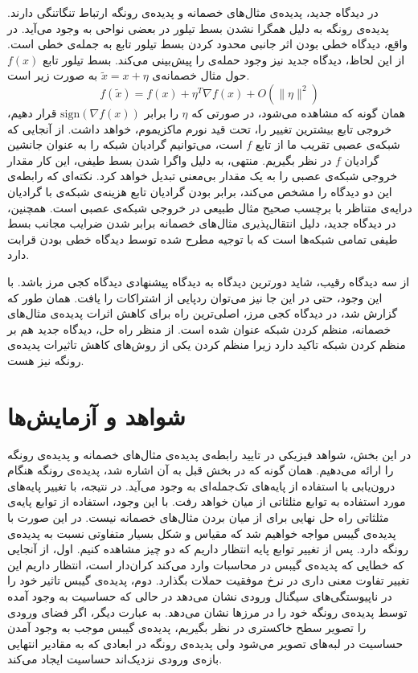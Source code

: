 \documentclass[12pt,onecolumn,a4paper]{article}
\begin{document}
در دیدگاه جدید، پدیده‌ی مثال‌های خصمانه و پدیده‌ی رونگه ارتباط تنگاتنگی دارند. پدیده‌ی رونگه به دلیل همگرا نشدن بسط  تیلور در بعضی نواحی به وجود می‌آید. در واقع، دیدگاه خطی بودن اثر جانبی محدود کردن بسط تیلور تابع به جمله‌ی خطی است. از این لحاظ، دیدگاه جدید نیز وجود حمله‌ی
را پیش‌بینی می‌کند. بسط تیلور تابع $f(x)$ حول مثال خصمانه‌ی $\tilde{x}=x+\eta$ به صورت زیر است.
\begin{equation*}
f(\tilde{x})=f(x)+\eta^T\nabla f(x) + O(\|\eta\|^2)
\end{equation*}
همان گونه که مشاهده می‌شود، در صورتی که $\eta$ را برابر $\mathrm{sign}(\nabla f(x))$ قرار دهیم، خروجی تابع بیشترین تغییر را، تحت قید نورم ماکزیموم، خواهد داشت. از آنجایی که شبکه‌ی عصبی تقریب ما از تابع $f$ است، می‌توانیم گرادیان شبکه را به عنوان جانشین گرادیان $f$ در نظر بگیریم. منتهی، به دلیل واگرا شدن بسط طیفی، این کار مقدار خروجی شبکه‌ی عصبی را به یک مقدار بی‌معنی تبدیل خواهد کرد. نکته‌ای که رابطه‌ی این دو دیدگاه را مشخص می‌کند، برابر بودن گرادیان تابع هزینه‌ی شبکه‌ی  با گرادیان درایه‌ی متناظر با برچسب صحیح مثال طبیعی در خروجی شبکه‌ی عصبی است. همچنین، در دیدگاه جدید، دلیل انتقال‌پذیری مثال‌های خصمانه برابر شدن ضرایب مجانب بسط طیفی تمامی شبکه‌ها است که با توجیه مطرح شده توسط دیدگاه خطی بودن قرابت دارد.

از سه دیدگاه رقیب، شاید دورترین دیدگاه به دیدگاه پیشنهادی دیدگاه کجی مرز باشد. با این وجود، حتی در این جا نیز می‌توان ردپایی از اشتراکات را یافت. همان طور که گزارش شد، در دیدگاه کجی مرز، اصلی‌ترین راه برای کاهش اثرات پدیده‌ی مثال‌های خصمانه، منظم کردن شبکه عنوان شده است. از منظر راه حل، دیدگاه جدید هم بر منظم کردن شبکه تاکید دارد زیرا منظم کردن یکی از روش‌های کاهش تاثیرات پدیده‌ی رونگه نیز هست.

\section{شواهد و آزمایش‌ها}
در این بخش، شواهد فیزیکی در تایید رابطه‌ی پدیده‌ی مثال‌های خصمانه و پدیده‌ی رونگه را ارائه می‌دهیم. همان گونه که در بخش قبل به آن اشاره شد، پدیده‌ی رونگه هنگام درون‌یابی با استفاده از پایه‌های تک‌جمله‌ای به وجود می‌آید. در نتیجه، با تغییر پایه‌های مورد استفاده به توابع مثلثاتی از میان خواهد رفت. با این وجود، استفاده از توابع پایه‌ی مثلثاتی راه حل نهایی برای از میان بردن مثال‌های خصمانه نیست. در این صورت با پدیده‌ی گیبس مواجه خواهیم شد که مقیاس و شکل بسیار متفاوتی نسبت به پدیده‌ی رونگه دارد. پس از تغییر توابع پایه‌ انتظار داریم که دو چیز مشاهده کنیم. اول، از آنجایی که خطایی که پدیده‌ی گیبس در محاسبات وارد می‌کند کران‌دار است، انتظار داریم این تغییر تفاوت معنی داری در نرخ موفقیت حملات بگذارد. دوم، پدیده‌ی گیبس تاثیر خود را در ناپیوستگی‌های سیگنال ورودی نشان می‌دهد در حالی که حساسیت به وجود آمده توسط پدیده‌ی رونگه خود را در مرزها نشان می‌دهد. به عبارت دیگر، اگر فضای ورودی را تصویر سطح خاکستری در نظر بگیریم، پدیده‌ی گیبس موجب به وجود آمدن حساسیت در لبه‌های تصویر می‌شود ولی پدیده‌ی رونگه در ابعادی که به مقادیر انتهایی بازه‌ی ورودی نزدیک‌اند حساسیت ایجاد می‌کند.
\end{document}
